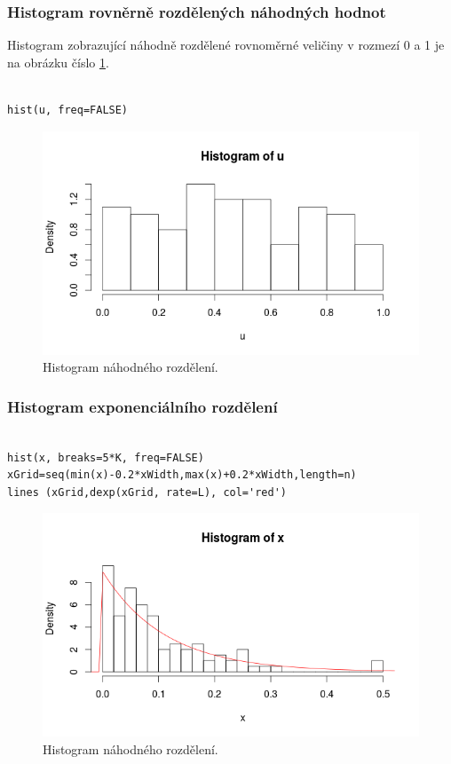 \documentclass[12pt]{article}
\begin{document}
\subsubsection{Histogram rovněrně rozdělených náhodných hodnot}
\begin{footnotesize}
\color{black}
Histogram zobrazující náhodně rozdělené rovnoměrné veličiny v rozmezí 0 a 1 je na obrázku číslo \ref{obr:histogram_u}.
\end{footnotesize}
\begin{lstlisting}[frame=single]  % Start your code-block
    
hist(u, freq=FALSE)
\end{lstlisting}
\begin{figure}[h!t]
	\includegraphics[scale=0.5]{img/histogram_u}\centering
	\caption{Histogram náhodného rozdělení.}
	\label{obr:histogram_u}
\end{figure}

\subsubsection{Histogram exponenciálního rozdělení}
  \begin{lstlisting}[frame=single]  % Start your code-block
  	
hist(x, breaks=5*K, freq=FALSE)
xGrid=seq(min(x)-0.2*xWidth,max(x)+0.2*xWidth,length=n) 
lines (xGrid,dexp(xGrid, rate=L), col='red') 
\end{lstlisting}
\begin{figure}[ht!]
	\includegraphics[scale=0.5]{img/histogram_x}\centering
	\caption{Histogram náhodného rozdělení.}
 	\label{obr:histogram_x}
\end{figure}
\end{document}
